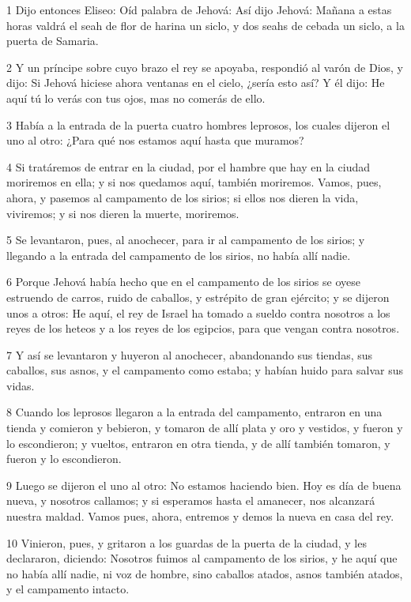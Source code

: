 \par 1 Dijo entonces Eliseo: Oíd palabra de Jehová: Así dijo Jehová: Mañana a estas horas valdrá el seah   de flor de harina un siclo, y dos seahs de cebada un siclo, a la puerta de Samaria.
\par 2 Y un príncipe sobre cuyo brazo el rey se apoyaba, respondió al varón de Dios, y dijo: Si Jehová hiciese ahora ventanas en el cielo, ¿sería esto así? Y él dijo: He aquí tú lo verás con tus ojos, mas no comerás de ello.
\par 3 Había a la entrada de la puerta cuatro hombres leprosos, los cuales dijeron el uno al otro: ¿Para qué nos estamos aquí hasta que muramos?
\par 4 Si tratáremos de entrar en la ciudad, por el hambre que hay en la ciudad moriremos en ella; y si nos quedamos aquí, también moriremos. Vamos, pues, ahora, y pasemos al campamento de los sirios; si ellos nos dieren la vida, viviremos; y si nos dieren la muerte, moriremos.
\par 5 Se levantaron, pues, al anochecer, para ir al campamento de los sirios; y llegando a la entrada del campamento de los sirios, no había allí nadie.
\par 6 Porque Jehová había hecho que en el campamento de los sirios se oyese estruendo de carros, ruido de caballos, y estrépito de gran ejército; y se dijeron unos a otros: He aquí, el rey de Israel ha tomado a sueldo contra nosotros a los reyes de los heteos y a los reyes de los egipcios, para que vengan contra nosotros.
\par 7 Y así se levantaron y huyeron al anochecer, abandonando sus tiendas, sus caballos, sus asnos, y el campamento como estaba; y habían huido para salvar sus vidas.
\par 8 Cuando los leprosos llegaron a la entrada del campamento, entraron en una tienda y comieron y bebieron, y tomaron de allí plata y oro y vestidos, y fueron y lo escondieron; y vueltos, entraron en otra tienda, y de allí también tomaron, y fueron y lo escondieron.
\par 9 Luego se dijeron el uno al otro: No estamos haciendo bien. Hoy es día de buena nueva, y nosotros callamos; y si esperamos hasta el amanecer, nos alcanzará nuestra maldad. Vamos pues, ahora, entremos y demos la nueva en casa del rey.
\par 10 Vinieron, pues, y gritaron a los guardas de la puerta de la ciudad, y les declararon, diciendo: Nosotros fuimos al campamento de los sirios, y he aquí que no había allí nadie, ni voz de hombre, sino caballos atados, asnos también atados, y el campamento intacto.
